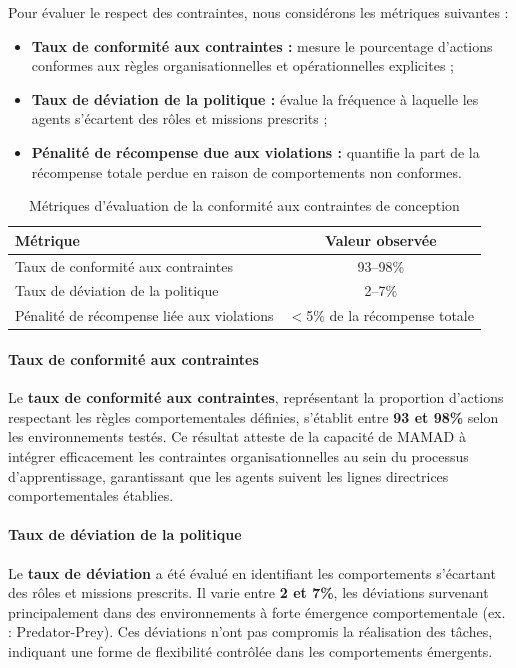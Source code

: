 \documentclass[pdflatex,sn-mathphys-num]{sn-jnl}%
\theoremstyle{thmstyleone}%
\theoremstyle{thmstyletwo}%
\theoremstyle{thmstylethree}%
\begin{document}
Pour évaluer le respect des contraintes, nous considérons les métriques suivantes :

\begin{itemize}
    \item \textbf{Taux de conformité aux contraintes :} mesure le pourcentage d'actions conformes aux règles organisationnelles et opérationnelles explicites ;
    \item \textbf{Taux de déviation de la politique :} évalue la fréquence à laquelle les agents s'écartent des rôles et missions prescrits ;
    \item \textbf{Pénalité de récompense due aux violations :} quantifie la part de la récompense totale perdue en raison de comportements non conformes.
\end{itemize}

\begin{table}[h!]
    \centering
    \caption{Métriques d'évaluation de la conformité aux contraintes de conception}
    \begin{tabular}{lc}
        \hline
        \textbf{Métrique}                                & \textbf{Valeur observée} \\
        \hline
        Taux de conformité aux contraintes               & 93--98\%                  \\
        \hline
        Taux de déviation de la politique                & 2--7\%                    \\
        \hline
        Pénalité de récompense liée aux violations       & $<$5\% de la récompense totale \\
        \hline
    \end{tabular}
    \label{tab:compliance_fr}
\end{table}

\paragraph{Taux de conformité aux contraintes}
Le \textbf{taux de conformité aux contraintes}, représentant la proportion d'actions respectant les règles comportementales définies, s'établit entre \textbf{93 et 98\%} selon les environnements testés. Ce résultat atteste de la capacité de MAMAD à intégrer efficacement les contraintes organisationnelles au sein du processus d'apprentissage, garantissant que les agents suivent les lignes directrices comportementales établies.

\paragraph{Taux de déviation de la politique}
Le \textbf{taux de déviation} a été évalué en identifiant les comportements s'écartant des rôles et missions prescrits. Il varie entre \textbf{2 et 7\%}, les déviations survenant principalement dans des environnements à forte émergence comportementale (ex. : Predator-Prey). Ces déviations n'ont pas compromis la réalisation des tâches, indiquant une forme de flexibilité contrôlée dans les comportements émergents.
\end{document}
